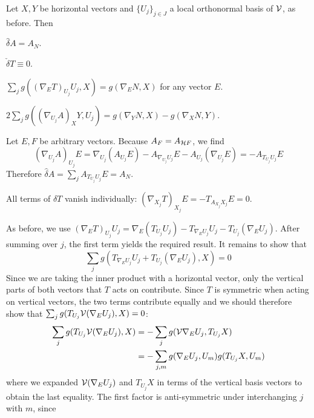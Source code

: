 \begin{lem}
	Let $X,Y$ be horizontal vectors and $\{U_j\}_{j\in J}$ a local orthonormal basis of $\mathcal{V}$, as before. Then
	\begin{numberedlist}
		\item $\hat\delta A=A_N$.
		\item $\check\delta T\equiv 0$.
		\item $\sum_j g((\nabla_E T)_{U_j}U_j,X)=g(\nabla_E N,X)$ for any vector $E$.
		\item $2\sum_j g((\nabla_{U_j}A)_X Y,U_j)=g(\nabla_Y N,X)-g(\nabla_X N,Y)$.
	\end{numberedlist}
\end{lem}
\begin{myproof}\leavevmode
	\begin{numberedlist}
		\item Let $E,F$ be arbitrary vectors. Because $A_F=A_{\mathcal{H} F}$, we find 
		\begin{equation*}
			(\nabla_{U_j}A)_{U_j}E= \nabla_{U_j}(A_{U_j}E)-A_{\nabla_{U_j}U_j}E-A_{U_j}(\nabla_{U_j} E)
			=-A_{T_{U_j}U_j}E
		\end{equation*}
		Therefore $\hat\delta A=\sum_j A_{T_{U_j}U_j}E=A_N$.
		\item All terms of $\hat\delta T$ vanish individually: $(\nabla_{X_j}T)_{X_j}E=-T_{A_{X_j}X_j} E=0$.
		\item As before, we use $(\nabla_E T)_{U_j}U_j=\nabla_E (T_{U_j}U_j)-T_{\nabla_E U_j}U_j -T_{U_j}(\nabla_E U_j)$. After summing over $j$, the first term yields the required result. It remains to show that 
		\begin{equation*}
			\sum_j g(T_{\nabla_E U_j}U_j+T_{U_j}(\nabla_E U_j),X)=0
		\end{equation*}
		Since we are taking the inner product with a horizontal vector, only the vertical parts of both vectors that $T$ acts on contribute. Since $T$ is symmetric when acting on vertical vectors, the two terms contribute equally and we should therefore show that $\sum_j g(T_{U_j}\mathcal{V}(\nabla_E U_j),X)=0$:
		\begin{align*}
			\sum_j g(T_{U_j}\mathcal{V}(\nabla_E U_j),X)&=-\sum_j g(\mathcal{V}\nabla_E U_j,T_{U_j}X)\\
			&=-\sum_{j,m} g(\nabla_E U_j,U_m)g(T_{U_j}X,U_m)
		\end{align*}
		where we expanded $\mathcal{V}(\nabla_E U_j)$ and $T_{U_j}X$ in terms of the vertical basis vectors to obtain the last equality. The first factor is anti-symmetric under interchanging $j$ with $m$, since

\end{numberedlist}
\end{myproof}
